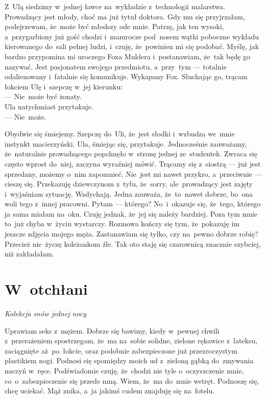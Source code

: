\documentclass[9pt, a5paper]{memoir}
\begin{document}
Z~Ulą siedzimy w~jednej ławce na~wykładzie z~technologii malarstwa. Prowadzący jest młody, choć ma już tytuł doktora. Gdy mu się przyjrzałam, podejrzewam, że~może być młodszy ode mnie. Patrzę, jak ten wysoki, a~przygarbiony już gość chodzi i~mamrocze pod~nosem wątki poboczne wykładu kierowanego do~sali pełnej ludzi, i~czuję, że~powinien mi się podobać. Myślę, jak bardzo przypomina mi uroczego Foxa Muldera i~postanawiam, że~tak będę go nazywać. Jest pasjonatem swojego przedmiotu, a~przy~tym --- totalnie odalienowany i~fatalnie się komunikuje. Wykapany Fox. Słuchając go, trącam łokciem Ulę i~szepczę w~jej kierunku:\\
--- Nie~może być żonaty.\\
Ula natychmiast przytakuje.\\
--- Nie~może.

Obydwie się śmiejemy. Szepczę do~Uli, że~jest słodki i~wzbudza we~mnie instynkt macierzyński. Ula, śmiejąc się, przytakuje. Jednocześnie zauważamy, że~naturalnie prowadzącego popchnęło w~stronę jednej ze~studentek. Zwraca się często wprost do~niej, zaczyna wyraźniej mówić. Trącamy się z~siostrą --- już jest sprzedany, możemy o~nim zapomnieć. Nie~jest mi nawet przykro, a~przeciwnie --- cieszę się. Przekazuję dziewczynom z~tyłu, że~sorry, ale~prowadzący jest zajęty i~wyjaśniam sytuację. Wzdychają. Jedna zauważa, że~to~nawet dobrze, bo~ona woli tego z~innej pracowni. Pytam --- którego? No~i~okazuje się, że~tego, którego ja sama miałam na~oku. Czuję jednak, że~jej się należy bardziej. Poza tym mnie to~już chyba w~życiu wystarczy. Rozmowa kończy się tym, że~pokazuję im jeszcze zdjęcia mojego męża. Zastanawiam się tylko, czy na~pewno dobrze robię? Przecież nie~życzę koleżankom źle. Tak oto staję się czarownicą znacznie szybciej, niż zakładałam.
\newpage
\section{W~otchłani}
{
\itshape
Kolekcja snów jednej nocy
}

Uprawiam seks z~mężem. Dobrze się bawimy, kiedy w~pewnej chwili z~przerażeniem spostrzegam, że~ma na~sobie solidne, zielone rękawice z~lateksu, zaciągnięte aż~po~łokcie, oraz podobnie zabezpieczone już przezroczystym plastikiem nogi. Podnosi się spomiędzy moich ud z~zieloną gąbką do~zmywania naczyń w~ręce. Podświadomie czuję, że~chodzi nie tyle o~oczyszczenie mnie, co~o~zabezpieczenie się przede mną. Wiem, że~ma do~mnie wstręt. Podnoszę się, chcę uciekać. Mąż znika, a~ja jakimś cudem znajduję się na~fotelu.
\end{document}
